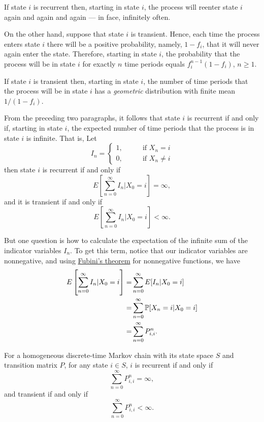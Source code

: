 \begin{remark}
    If state $i$ is recurrent then, starting in state $i$, the process will reenter state $i$ again and again and again --- in face, infinitely often.
\end{remark}

On the other hand, suppose that state $i$ is transient. Hence, each time the process enters state $i$ there will be a positive probability, namely, $1 - f_i$, that it will never again enter the state. Therefore, starting in state $i$, the probability that the process will be in state $i$ for exactly $n$ time periods equals $f_i^{n-1}(1 - f_i)$, $n \ge 1$. 

\begin{remark}
    If state $i$ is transient then, starting in state $i$, the number of time periods that the process will be in state $i$ has a \textit{geometric} distribution with finite mean $1/(1-f_i)$.
\end{remark}

From the preceding two paragraphs, it follows that state $i$ is recurrent if and only if, starting in state $i$, the expected number of time periods that the process is in state $i$ is infinite. That is,     Let
$$
I_n = 
\begin{cases}
    1, \qquad &\text{if } X_n = i \\ 
    0, \qquad &\text{if } X_n \neq i
\end{cases}
$$
then state $i$ is recurrent if and only if 
$$
E \left[ \sum_{n = 0}^\infty I_n | X_0 = i\right] = \infty ,
$$
and it is transient if and only if 
$$
E \left[ \sum_{n = 0}^\infty I_n | X_0 = i\right] < \infty.
$$

But one question is how to calculate the expectation of the infinite sum of the indicator variables $I_n$. To get this term, notice that our indicator variables are nonnegative, and using \href{https://en.wikipedia.org/wiki/Fubini%27s_theorem}{Fubini's theorem} for nonnegative functions, we have 
\begin{align*}
    E \left[ \sum_{n = 0}^\infty I_n | X_0 = i\right] = & \sum_{n=0}^\infty E[ I_n | X_0 =i ] \\ 
    = & \sum_{n=0}^\infty \mathbb{P}[X_n = i | X_0 = i] \\ 
    = & \sum_{n=0}^\infty P_{i, i}^n.
\end{align*}

\begin{proposition}\label{Recurrence and Transience prop}
    For a homogeneous discrete-time Markov chain with its state space $S$ and transition matrix $P$, for any state $i \in S$, $i$ is 
    recurrent if and only if 
    $$
    \sum_{n=0}^\infty P_{i, i}^n = \infty,
    $$
    and transient if and only if 
    $$
    \sum_{n=0}^\infty P_{i, i}^n < \infty.
    $$
\end{proposition}

